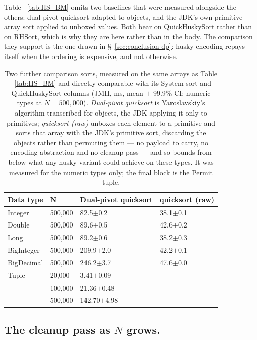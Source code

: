 \documentclass[twoside,leqno,twocolumn]{article}
\begin{document}
Table ~\ref{tab:HS_BM} omits two baselines that were measured alongside the others: dual-pivot
quicksort adapted to objects, and the JDK's own primitive-array sort applied to unboxed values.
Both bear on QuickHuskySort rather than on RHSort, which is why they are here rather than in the
body.
The comparison they support is the one drawn in \S~\ref{sec:conclusion-dp}: husky encoding repays
itself when the ordering is expensive, and not otherwise.

\begin{table}
  \caption{Two further comparison sorts, measured on the same arrays as Table ~\ref{tab:HS_BM} and
    directly comparable with its System sort and QuickHuskySort columns (JMH, ms, mean $\pm$ 99.9\% CI;
    numeric types at $N=500{,}000$). \emph{Dual-pivot quicksort} is Yaroslavskiy's algorithm
    transcribed for objects, the JDK applying it only to primitives; \emph{quicksort (raw)} unboxes each
    element to a primitive and sorts that array with the JDK's primitive sort, discarding the objects
    rather than permuting them --- no payload to carry, no encoding abstraction and no cleanup pass ---
    and so bounds from below what any husky variant could achieve on these types. It was measured for
    the numeric types only; the final block is the Permit tuple.}
  \label{tab:ComparisonBaselines}
  \begin{tabular}{llll}
    \toprule
    Data type & N & Dual-pivot quicksort & quicksort (raw) \\
    \midrule
    Integer & 500,000 & 82.5$\pm$0.2 & 38.1$\pm$0.1 \\
    Double & 500,000 & 89.6$\pm$0.5 & 42.6$\pm$0.2 \\
    Long & 500,000 & 89.2$\pm$0.6 & 38.2$\pm$0.3 \\
    BigInteger & 500,000 & 209.9$\pm$2.0 & 42.2$\pm$0.1 \\
    BigDecimal & 500,000 & 246.2$\pm$3.7 & 47.6$\pm$0.0 \\
    \midrule
    Tuple & 20,000 & 3.41$\pm$0.09 & --- \\
    & 100,000 & 21.36$\pm$0.48 & --- \\
    & 500,000 & 142.70$\pm$4.98 & --- \\
    \bottomrule
  \end{tabular}
\end{table}

\subsection{The cleanup pass as \texorpdfstring{$N$}{N} grows.}
\label{sec:cleanup-scaling}
\end{document}
